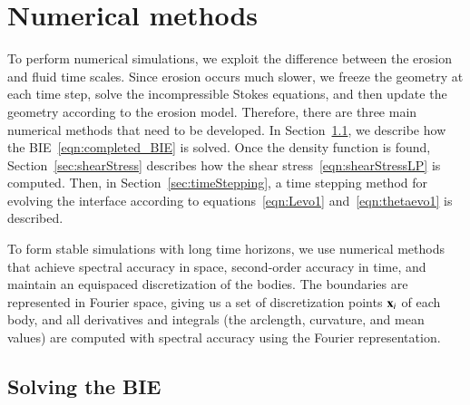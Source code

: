 \documentclass[preprint, 10pt]{elsarticle}
\begin{document}
\section{Numerical methods}
\label{s:method}
To perform numerical simulations, we exploit the difference
between the erosion and fluid time scales.  Since erosion occurs
much slower, we freeze the geometry at each time
step, solve the incompressible Stokes equations, and then update the
geometry according to the erosion model.  Therefore, there are three
main numerical methods that need to be developed.  In
Section~\ref{sec:BIE}, we describe how the BIE~\eqref{eqn:completed_BIE}
is solved.  Once the density function is found,
Section~\ref{sec:shearStress} describes how the shear
stress~\eqref{eqn:shearStressLP} is computed.  Then, in
Section~\ref{sec:timeStepping}, a time stepping method for evolving the
interface according to equations~\eqref{eqn:Levo1}
and~\eqref{eqn:thetaevo1} is described. 

To form stable simulations with long time horizons, we use numerical
methods that achieve spectral accuracy in space, second-order accuracy
in time, and maintain an equispaced discretization of the bodies.  The
boundaries are represented in Fourier space, giving us a set of
discretization points ${\mathbf{x}}_i$ of each body, and all derivatives and
integrals (the arclength, curvature, and mean values) are computed with
spectral accuracy using the Fourier representation.

\subsection{Solving the BIE}
\label{sec:BIE}
\end{document}

